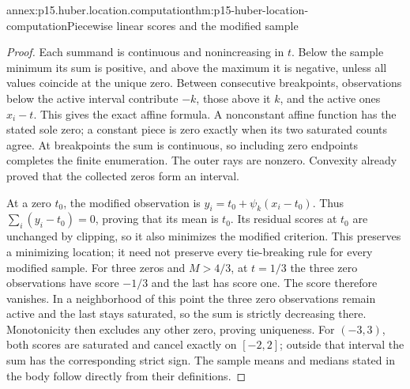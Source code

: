 \begin{annexitem}{annex:p15.huber.location.computation}{thm:p15-huber-location-computation}{Piecewise linear scores and the modified sample}
\begin{proof}
Each summand is continuous and nonincreasing in \(t\).
Below the sample minimum its sum is positive, and above the maximum
it is negative, unless all values coincide at the unique zero.
Between consecutive breakpoints, observations below the active
interval contribute \(-k\), those above it \(k\), and the active
ones \(x_i-t\). This gives the exact affine formula.
A nonconstant affine function has the stated sole zero; a constant
piece is zero exactly when its two saturated counts agree.
At breakpoints the sum is continuous, so including zero endpoints
completes the finite enumeration. The outer rays are nonzero.
Convexity already proved that the collected zeros form an interval.

At a zero \(t_0\), the modified observation is
\(y_i=t_0+\psi_k(x_i-t_0)\). Thus
\(\sum_i(y_i-t_0)=0\), proving that its mean is \(t_0\).
Its residual scores at \(t_0\) are unchanged by clipping, so it
also minimizes the modified criterion. This preserves a minimizing
location; it need not preserve every tie-breaking rule for every
modified sample.
For three zeros and \(M>4/3\), at \(t=1/3\) the three zero
observations have score \(-1/3\) and the last has score one.
The score therefore vanishes. In a neighborhood of this point
the three zero observations remain active and the last stays
saturated, so the sum is strictly decreasing there. Monotonicity
then excludes any other zero, proving uniqueness.
For \((-3,3)\), both scores are saturated and cancel exactly on
\([-2,2]\); outside that interval the sum has the corresponding
strict sign. The sample means and medians stated in the body
follow directly from their definitions.
\end{proof}
\end{annexitem}

